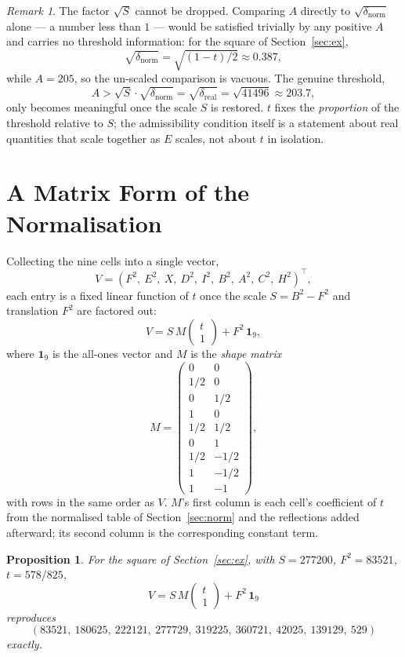 \documentclass[12pt]{article}
\newtheorem{proposition}[theorem]{Proposition}
\theoremstyle{remark}
\newtheorem{remark}[theorem]{Remark}
\begin{document}
\begin{remark}
The factor $\sqrt{S}$ cannot be dropped. Comparing $A$ directly to
$\sqrt{\delta_{\text{norm}}}$ alone --- a number less than $1$ ---
would be satisfied trivially by any positive $A$ and carries no
threshold information: for the square of Section~\ref{sec:ex},
\[
\sqrt{\delta_{\text{norm}}} = \sqrt{(1-t)/2} \approx 0.387,
\]
while $A = 205$, so the un-scaled comparison is vacuous. The genuine
threshold,
\[
A > \sqrt{S}\cdot\sqrt{\delta_{\text{norm}}}
= \sqrt{\delta_{\text{real}}} = \sqrt{41496} \approx 203.7 ,
\]
only becomes meaningful once the scale $S$ is restored. $t$ fixes the
\emph{proportion} of the threshold relative to $S$; the admissibility
condition itself is a statement about real quantities that scale
together as $E$ scales, not about $t$ in isolation.
\end{remark}

\section{A Matrix Form of the Normalisation}\label{sec:matrix}

Collecting the nine cells into a single vector,
\[
V = (F^2,\ E^2,\ X,\ D^2,\ I^2,\ B^2,\ A^2,\ C^2,\ H^2)^\top ,
\]
each entry is a fixed linear function of $t$ once the scale
$S = B^2 - F^2$ and translation $F^2$ are factored out:
\[
V = S\,M \begin{pmatrix} t \\ 1 \end{pmatrix} + F^2\,\mathbf{1}_9 ,
\]
where $\mathbf{1}_9$ is the all-ones vector and $M$ is the
\emph{shape matrix}
\[
M =
\begin{pmatrix}
0 & 0 \\
1/2 & 0 \\
0 & 1/2 \\
1 & 0 \\
1/2 & 1/2 \\
0 & 1 \\
1/2 & -1/2 \\
1 & -1/2 \\
1 & -1
\end{pmatrix} ,
\]
with rows in the same order as $V$. $M$'s first column is each cell's
coefficient of $t$ from the normalised table of
Section~\ref{sec:norm} and the reflections added afterward; its
second column is the corresponding constant term.

\begin{proposition}\label{prop:matrixform}
For the square of Section~\ref{sec:ex}, with $S = 277200$,
$F^2 = 83521$, $t = 578/825$,
\[
V = S\,M \begin{pmatrix} t \\ 1 \end{pmatrix} + F^2\,\mathbf{1}_9
\]
reproduces
\[
(83521,\ 180625,\ 222121,\ 277729,\ 319225,\ 360721,\ 42025,\
139129,\ 529)
\]
exactly.
\end{proposition}
\end{document}

